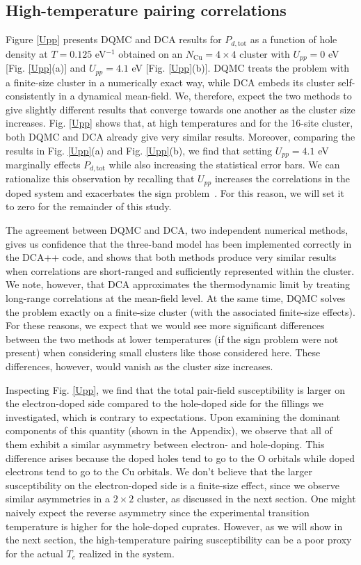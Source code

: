 \documentclass[reprint,nofootinbib,nobibnotes,amsmath,amssymb,aps,prb,floatfix]{revtex4-1}
\newcommand{\figdisp}[1]{Fig. \ref{#1}}
\begin{document}
\subsection{High-temperature pairing correlations} 
Figure \ref{Upp} presents DQMC and DCA results for $P_{d,\text{tot}}$ 
as a function of hole density at $T=0.125$ eV$^{-1}$ obtained on an $N_{\textrm{Cu}}=4\times4$ cluster with $U_{pp}=0$ eV [\figdisp{Upp}(a)] and $U_{pp}=4.1$ eV [\figdisp{Upp}(b)]. 
DQMC treats the problem with a finite-size cluster in a numerically exact way, while DCA embeds its cluster self-consistently in a dynamical mean-field. We, therefore, expect the two methods to give slightly different results that converge towards one another as the cluster size increases. 
Fig. \ref{Upp} shows that, at high temperatures and for the 16-site cluster, both DQMC and DCA already give very similar results. Moreover, comparing the results in \figdisp{Upp}(a) and \figdisp{Upp}(b), we find that setting $U_{pp}=4.1$ eV marginally effects $P_{d,\text{tot}}$ while also increasing the statistical error bars. We can rationalize this observation by recalling that $U_{pp}$ increases the correlations in the doped system and exacerbates the sign problem~\cite{Kung}. For this reason, we will set it to zero for the remainder of this study. 

The agreement between DQMC and DCA, two independent numerical methods, gives us confidence that the three-band model has been implemented correctly in the DCA++ code, and shows that both methods produce very similar results when correlations are short-ranged and sufficiently represented within the cluster. We note, however, that DCA approximates the thermodynamic limit by treating long-range correlations at the mean-field level. At the same time, DQMC solves the problem exactly on a finite-size cluster (with the associated finite-size effects). For these reasons, we expect that we would see more significant differences between the two methods at lower temperatures (if the sign problem were not present) when considering small clusters like those considered here. These differences, however, would vanish as the cluster size increases.

Inspecting \figdisp{Upp}, we find that the total pair-field susceptibility is larger on the electron-doped side compared to the hole-doped side for the fillings we investigated, which is contrary to expectations. Upon examining the dominant components of this quantity (shown in the Appendix), we observe that all of them exhibit a similar asymmetry between electron- and hole-doping. This difference arises because the doped holes tend to go to the O orbitals while doped electrons tend to go to the Cu orbitals. We don't believe that the larger susceptibility on the electron-doped side is a finite-size effect, since we observe similar asymmetries in a $2\times2$ cluster, as discussed in the next section. One might naively expect the reverse asymmetry since the experimental transition temperature is higher for the hole-doped cuprates. However, as we will show in the next section, the high-temperature pairing susceptibility can be a poor proxy for the actual $T_c$ realized in the system. 
\end{document}
